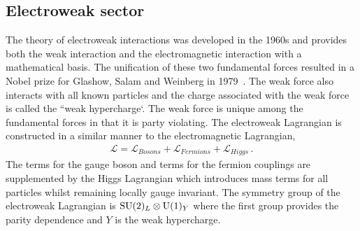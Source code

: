 \subsection{Electroweak sector}

The theory of electroweak interactions was developed in the 1960s and provides both the weak interaction and the 
electromagnetic interaction with a mathematical basis. 
The unification of these two fundamental forces resulted in a Nobel prize for 
Glashow, Salam and Weinberg in 1979~\cite{Glashow:1961tr,Weinberg:1967tq,Salam:1968rm}.
The weak force also interacts with all known particles and the charge associated with the weak force is called the ``weak hypercharge`.
The weak force is unique among the fundamental forces in that it is party violating.
The electroweak Lagrangian is constructed in a similar manner to the electromagnetic Lagrangian, 
\begin{align}
\mathcal{L} = \mathcal{L}_{Bosons} + \mathcal{L}_{Fermions} + \mathcal{L}_{Higgs} \, .
\end{align}
The terms for the gauge boson and terms for the fermion couplings are supplemented by the Higgs Lagrangian which 
introduces mass terms for all particles whilst remaining locally gauge invariant.
The symmetry group of the electroweak Lagrangian is  $\mathrm{SU}(2)_L \otimes \mathrm{U}(1)_Y$ where the first group 
provides the parity dependence and $Y$ is the weak hypercharge.

